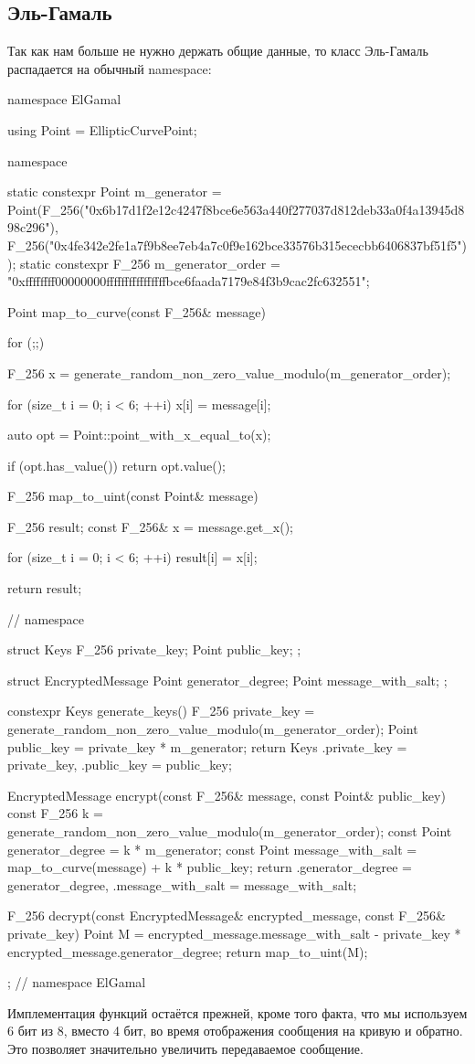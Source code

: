 \subsection{Эль-Гамаль}
Так как нам больше не нужно держать общие данные, то класс Эль-Гамаль распадается на обычный namespace:
\begin{cppcode}
namespace ElGamal {
    using Point = EllipticCurvePoint;

    namespace {
        static constexpr Point m_generator =
            Point(F_256("0x6b17d1f2e12c4247f8bce6e563a440f277037d812deb33a0f4a13945d898c296"),
                  F_256("0x4fe342e2fe1a7f9b8ee7eb4a7c0f9e162bce33576b315ececbb6406837bf51f5"));
        static constexpr F_256 m_generator_order =
            "0xffffffff00000000ffffffffffffffffbce6faada7179e84f3b9cac2fc632551";

        Point map_to_curve(const F_256& message) {
            for (;;) {
                F_256 x = generate_random_non_zero_value_modulo(m_generator_order);

                for (size_t i = 0; i < 6; ++i) {
                    x[i] = message[i];
                }

                auto opt = Point::point_with_x_equal_to(x);

                if (opt.has_value()) {
                    return opt.value();
                }
            }
        }

        F_256 map_to_uint(const Point& message) {
            F_256 result;
            const F_256& x = message.get_x();

            for (size_t i = 0; i < 6; ++i) {
                result[i] = x[i];
            }

            return result;
        }
    }   // namespace

    struct Keys {
        F_256 private_key;
        Point public_key;
    };

    struct EncryptedMessage {
        Point generator_degree;
        Point message_with_salt;
    };

    constexpr Keys generate_keys() {
        F_256 private_key = generate_random_non_zero_value_modulo(m_generator_order);
        Point public_key = private_key * m_generator;
        return Keys {.private_key = private_key, .public_key = public_key};
    }

    EncryptedMessage encrypt(const F_256& message, const Point& public_key) {
        const F_256 k = generate_random_non_zero_value_modulo(m_generator_order);
        const Point generator_degree = k * m_generator;
        const Point message_with_salt = map_to_curve(message) + k * public_key;
        return {.generator_degree = generator_degree, .message_with_salt = message_with_salt};
    }

    F_256 decrypt(const EncryptedMessage& encrypted_message, const F_256& private_key) {
        Point M = encrypted_message.message_with_salt - private_key * encrypted_message.generator_degree;
        return map_to_uint(M);
    }
};   // namespace ElGamal
\end{cppcode}
Имплементация функций остаётся прежней, кроме того факта, что мы используем 6 бит из 8, вместо 4 бит, во время отображения сообщения на кривую и обратно. Это позволяет значительно увеличить передаваемое сообщение.
